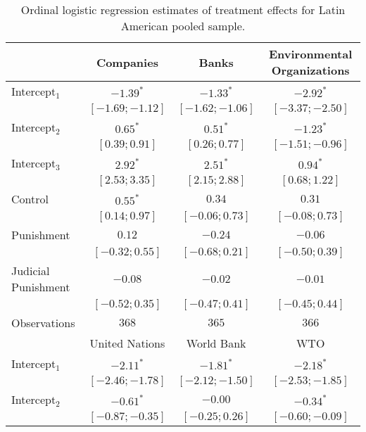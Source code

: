 \begin{table}[h]
\begin{center}
\caption{Ordinal logistic regression estimates of treatment effects for Latin American pooled sample.}
\begin{threeparttable}
\begin{tabular}{l c c c}
\hline
 & Companies & Banks & Environmental
Organizations \\
\hline
Intercept$_1$       & $-1.39^{*}$       & $-1.33^{*}$       & $-2.92^{*}$       \\
                    & $ [-1.69; -1.12]$ & $ [-1.62; -1.06]$ & $ [-3.37; -2.50]$ \\
Intercept$_2$       & $0.65^{*}$        & $0.51^{*}$        & $-1.23^{*}$       \\
                    & $ [ 0.39;  0.91]$ & $ [ 0.26;  0.77]$ & $ [-1.51; -0.96]$ \\
Intercept$_3$       & $2.92^{*}$        & $2.51^{*}$        & $0.94^{*}$        \\
                    & $ [ 2.53;  3.35]$ & $ [ 2.15;  2.88]$ & $ [ 0.68;  1.22]$ \\
Control             & $0.55^{*}$        & $0.34$            & $0.31$            \\
                    & $ [ 0.14;  0.97]$ & $ [-0.06;  0.73]$ & $ [-0.08;  0.73]$ \\
Punishment          & $0.12$            & $-0.24$           & $-0.06$           \\
                    & $ [-0.32;  0.55]$ & $ [-0.68;  0.21]$ & $ [-0.50;  0.39]$ \\
Judicial Punishment & $-0.08$           & $-0.02$           & $-0.01$           \\
                    & $ [-0.52;  0.35]$ & $ [-0.47;  0.41]$ & $ [-0.45;  0.44]$ \\
\hline
Observations        & $368$             & $365$             & $366$             \\
\hline
 & United Nations & World Bank & WTO \\
\hline
Intercept$_1$       & $-2.11^{*}$       & $-1.81^{*}$       & $-2.18^{*}$       \\
                    & $ [-2.46; -1.78]$ & $ [-2.12; -1.50]$ & $ [-2.53; -1.85]$ \\
Intercept$_2$       & $-0.61^{*}$       & $-0.00$           & $-0.34^{*}$       \\
                    & $ [-0.87; -0.35]$ & $ [-0.25;  0.26]$ & $ [-0.60; -0.09]$ \\

\end{tabular}
\end{threeparttable}
\end{center}
\end{table}
